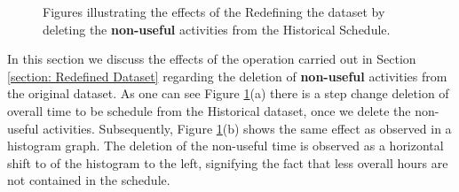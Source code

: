 \begin{figure}[ht]
    \centering
    \qquad
    \centering
    \caption{Figures illustrating the effects of the Redefining the dataset by deleting the \textbf{non-useful} activities from the Historical Schedule.}%
    \label{fig: Redefined Historical.}%
\end{figure}

In this section we discuss the effects of the operation carried out in Section \ref{section: Redefined Dataset} regarding the deletion of \textbf{non-useful} activities from the original dataset. As one can see Figure \ref{fig: Redefined Historical.}(a) there is a step change deletion of overall time to be schedule from the Historical dataset, once we delete the non-useful activities. Subsequently, Figure \ref{fig: Redefined Historical.}(b) shows the same effect as observed in a histogram graph. The deletion of the non-useful time is observed as a horizontal shift to of the histogram to the left, signifying the fact that less overall hours are not contained in the schedule.

